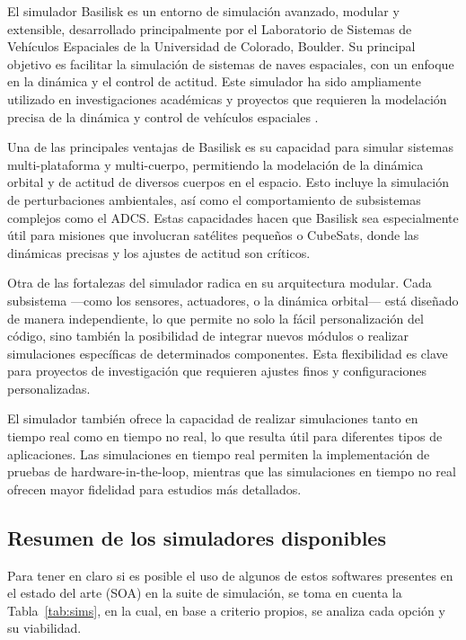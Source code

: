 El simulador Basilisk es un entorno de simulación avanzado, modular y extensible, desarrollado principalmente por el Laboratorio de Sistemas de Vehículos Espaciales de la Universidad de Colorado, Boulder. Su principal objetivo es facilitar la simulación de sistemas de naves espaciales, con un enfoque en la dinámica y el control de actitud. Este simulador ha sido ampliamente utilizado en investigaciones académicas y proyectos que requieren la modelación precisa de la dinámica y control de vehículos espaciales \cite{ref36}.

Una de las principales ventajas de Basilisk es su capacidad para simular sistemas multi-plataforma y multi-cuerpo, permitiendo la modelación de la dinámica orbital y de actitud de diversos cuerpos en el espacio. Esto incluye la simulación de perturbaciones ambientales, así como el comportamiento de subsistemas complejos como el \gls{ADCS}. Estas capacidades hacen que Basilisk sea especialmente útil para misiones que involucran satélites pequeños o CubeSats, donde las dinámicas precisas y los ajustes de actitud son críticos.

Otra de las fortalezas del simulador radica en su arquitectura modular. Cada subsistema —como los sensores, actuadores, o la dinámica orbital— está diseñado de manera independiente, lo que permite no solo la fácil personalización del código, sino también la posibilidad de integrar nuevos módulos o realizar simulaciones específicas de determinados componentes. Esta flexibilidad es clave para proyectos de investigación que requieren ajustes finos y configuraciones personalizadas.

El simulador también ofrece la capacidad de realizar simulaciones tanto en tiempo real como en tiempo no real, lo que resulta útil para diferentes tipos de aplicaciones. Las simulaciones en tiempo real permiten la implementación de pruebas de hardware-in-the-loop, mientras que las simulaciones en tiempo no real ofrecen mayor fidelidad para estudios más detallados.

\subsection{Resumen de los simuladores disponibles}

Para tener en claro si es posible el uso de algunos de estos softwares presentes en el estado del arte (SOA) en la suite de simulación, se toma en cuenta la Tabla~\ref{tab:sims}, en la cual, en base a criterio propios, se analiza cada opción y su viabilidad.

